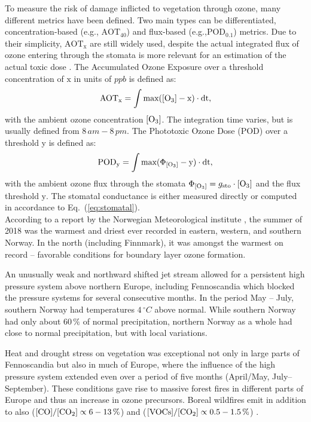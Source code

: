 \documentclass[bg, manuscript]{copernicus}
\begin{document}
To measure the risk of damage inflicted to vegetation through ozone, many different metrics have been defined. Two main types can be differentiated, concentration-based (e.g., $\mathrm{AOT_{40}}$) and flux-based (e.g.,$\mathrm{POD_{0.1}}$) metrics. Due to their simplicity, $\mathrm{AOT_{x}}$ are still widely used, despite the actual integrated flux of ozone entering through the stomata is more relevant for an estimation of the actual toxic dose \citep{ICP:MappingManual2017}. 
The Accumulated Ozone Exposure over a threshold concentration of $\mathrm{x}$ in units of $\unit{ppb}$ is defined as:
\begin{equation}
  \mathrm{AOT_x} = \int{\mathrm{max(\chem{[O_3]}-x)}\cdot \mathrm{dt}},
  \label{eq:aot}
\end{equation}
with the ambient ozone concentration $\chem{[O_3]}$. The integration time varies, but is usually defined from $8\,\unit{am}-8\,\unit{pm}$.
The Phototoxic Ozone Dose (POD) over a threshold y is defined as:
\begin{equation}
  \mathrm{POD_y} = \int{\mathrm{max(\Phi_\chem{[O_3]}-y)}\cdot \mathrm{dt}},
  \label{eq:pod}
\end{equation}
with the ambient ozone flux through the stomata $\Phi_\chem{[O_3]} = g_\mathrm{sto} \cdot \chem{[O_3]}$ and the flux threshold $\mathrm{y}$. The stomatal conductance is either measured directly or computed in accordance to Eq.~(\ref{eq:stomatal}).\\


According to a report by the Norwegian Meteorological institute \citep{MetNOR2019}, the summer of 2018 was the warmest and driest ever recorded in eastern, western, and southern Norway. In the north (including Finnmark), it was amongst the warmest on record -- favorable conditions for boundary layer ozone formation.

An unusually weak and northward shifted jet stream allowed for a persistent high pressure system above northern Europe, including Fennoscandia which blocked the pressure systems for several consecutive months. In the period May -- July, southern Norway had temperatures $4\,\unit{^\circ C}$ above normal. While southern Norway had only about $60\,\unit{\%}$ of normal precipitation, northern Norway as a whole had close to normal precipitation, but with local variations.

Heat and drought stress on vegetation was exceptional not only in large parts of Fennoscandia but also in much of Europe, where the influence of the high pressure system extended even over a period of five months (April/May, July--September). These conditions gave rise to massive forest fires in different parts of Europe and thus an increase in ozone precursors. Boreal wildfires emit in addition to  also  ($\chem{[CO]}/\chem{[CO_2]} \propto 6-13\,\unit{\%}$) and  ($\chem{[VOCs]}/\chem{[CO_2]} \propto 0.5-1.5\,\unit{\%}$) \citep{AE:Cofer1990}.
\end{document}
